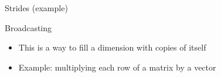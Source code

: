 \documentclass[utf8x,xcolor=pdftex,dvipsnames,table]{beamer}
\begin{document}
\begin{frame}{Strides (example)}
\begin{center}
\end{center}
\end{frame}

\begin{frame}{Broadcasting}
\begin{itemize}
\item This is a way to fill a dimension with copies of itself
\item Example: multiplying each row of a matrix by a vector
\end{itemize}
\end{frame}
\end{document}
